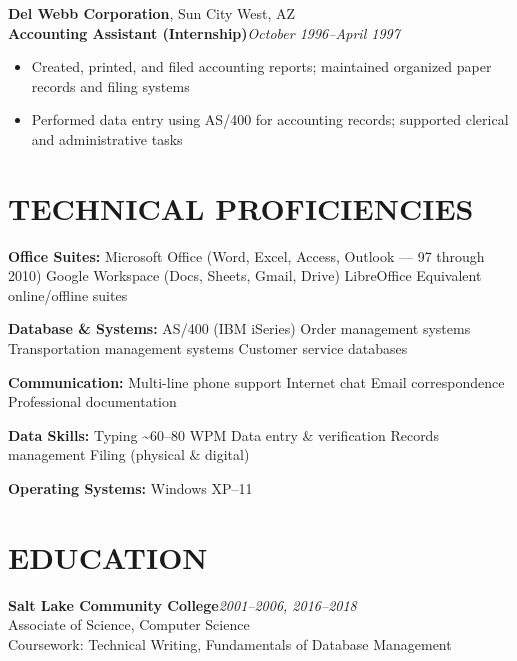 \documentclass[9pt,letterpaper]{extarticle}
\begin{document}
\vspace{5pt}
\noindent\textbf{Del Webb Corporation}, Sun City West, AZ\\
\textbf{Accounting Assistant (Internship)}\hfill\textit{October 1996--April 1997}
\begin{itemize}
  \item Created, printed, and filed accounting reports; maintained organized paper records and filing systems
  \item Performed data entry using AS/400 for accounting records; supported clerical and administrative tasks
\end{itemize}

\section*{TECHNICAL PROFICIENCIES}

\noindent\textbf{Office Suites:} Microsoft Office (Word, Excel, Access, Outlook --- 97 through 2010) \textbar{} Google Workspace (Docs, Sheets, Gmail, Drive) \textbar{} LibreOffice \textbar{} Equivalent online/offline suites

\noindent\textbf{Database \& Systems:} AS/400 (IBM iSeries) \textbar{} Order management systems \textbar{} Transportation management systems \textbar{} Customer service databases

\noindent\textbf{Communication:} Multi-line phone support \textbar{} Internet chat \textbar{} Email correspondence \textbar{} Professional documentation

\noindent\textbf{Data Skills:} Typing \textasciitilde{}60--80 WPM \textbar{} Data entry \& verification \textbar{} Records management \textbar{} Filing (physical \& digital)

\noindent\textbf{Operating Systems:} Windows XP--11

\section*{EDUCATION}

\noindent\textbf{Salt Lake Community College}\hfill\textit{2001--2006, 2016--2018}\\
Associate of Science, Computer Science\\
Coursework: Technical Writing, Fundamentals of Database Management
\end{document}
